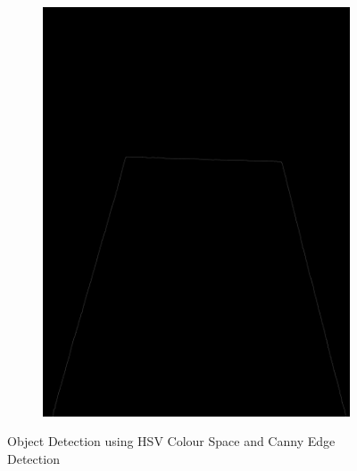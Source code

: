 \documentclass[a4paper,12pt]{article}
\begin{document}
\begin{appendices}
\begin{figure}[H]
\begin{subfigure}{.5\textwidth}
		\includegraphics[width=.98\textwidth]{4-1}
	\end{subfigure}
	\caption{\label{redlight} Object Detection using HSV Colour Space and Canny Edge Detection  }
\end{figure}


\end{appendices}
\end{document}
